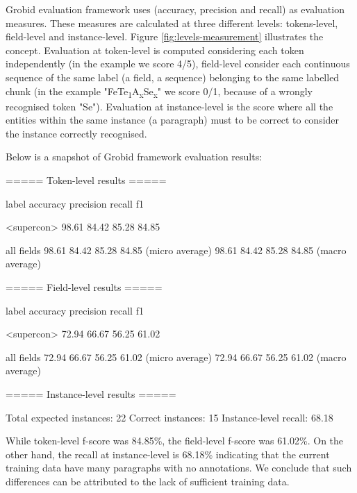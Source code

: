 \documentclass{article}[a4]
\begin{document}
Grobid evaluation framework uses (accuracy, precision and recall) as evaluation measures. These measures are calculated at three different levels: tokens-level, field-level and instance-level. Figure \ref{fig:levels-measurement} illustrates the concept. 
Evaluation at token-level is computed considering each token independently (in the example we score 4/5), field-level consider each continuous sequence of the same label (a field, a sequence) belonging to the same labelled chunk (in the example  "FeTe\textsubscript{1}A\textsubscript{x}Se\textsubscript{x}" we score 0/1, because of a wrongly recognised token "Se"). Evaluation at instance-level is the score where all the entities within the same instance (a paragraph) must to be correct to consider the instance correctly recognised. 

Below is a snapshot of Grobid framework evaluation results: 

\begin{verbnobox}[\small]
===== Token-level results =====

label                accuracy     precision    recall       f1     

<supercon>           98.61        84.42        85.28        84.85  

all fields           98.61        84.42        85.28        84.85   (micro average)
                     98.61        84.42        85.28        84.85   (macro average)

===== Field-level results =====

label                accuracy     precision    recall       f1     

<supercon>           72.94        66.67        56.25        61.02  

all fields           72.94        66.67        56.25        61.02   (micro average)
                     72.94        66.67        56.25        61.02   (macro average)

===== Instance-level results =====

Total expected instances:   22
Correct instances:          15
Instance-level recall:      68.18
\end{verbnobox}

While token-level f-score was 84.85\%, the field-level f-score was 61.02\%. On the other hand, the recall at instance-level is 68.18\% indicating that the current training data have many paragraphs with no annotations. We conclude that such differences can be attributed to the lack of sufficient training data. 
\end{document}

